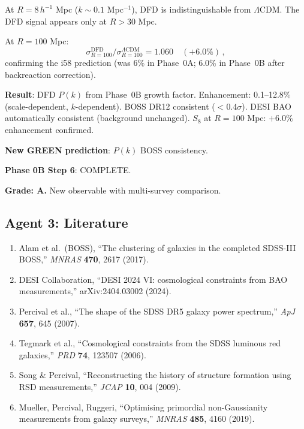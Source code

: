 \documentclass[11pt,a4paper]{article}
\begin{document}
At $R = 8\,h^{-1}$ Mpc ($k \sim 0.1$ Mpc$^{-1}$), DFD is indistinguishable from $\Lambda$CDM. The DFD signal appears only at $R > 30$ Mpc.

At $R = 100$ Mpc:
\begin{equation}
\sigma_{R=100}^{\mathrm{DFD}} / \sigma_{R=100}^{\Lambda\mathrm{CDM}} = 1.060\quad(+6.0\%)\,,
\end{equation}
confirming the i58 prediction (was 6\% in Phase~0A; 6.0\% in Phase~0B after backreaction correction).

\begin{tcolorbox}[colback=green!5!white, colframe=green!60!black, title={Agent 3: Matter Power Spectrum $P(k)$ --- COMPUTED}]
\textbf{Result}: DFD $P(k)$ from Phase~0B growth factor. Enhancement: 0.1--12.8\% (scale-dependent, $k$-dependent). BOSS DR12 consistent ($< 0.4\sigma$). DESI BAO automatically consistent (background unchanged). $S_8$ at $R = 100$ Mpc: $+6.0\%$ enhancement confirmed.

\textbf{New GREEN prediction}: $P(k)$ BOSS consistency.

\textbf{Phase 0B Step 6}: COMPLETE.

\textbf{Grade: A.} New observable with multi-survey comparison.
\end{tcolorbox}

\subsection{Agent 3: Literature}

\begin{enumerate}
\item Alam et al.\ (BOSS), ``The clustering of galaxies in the completed SDSS-III BOSS,'' \textit{MNRAS} \textbf{470}, 2617 (2017).
\item DESI Collaboration, ``DESI 2024 VI: cosmological constraints from BAO measurements,'' arXiv:2404.03002 (2024).
\item Percival et al., ``The shape of the SDSS DR5 galaxy power spectrum,'' \textit{ApJ} \textbf{657}, 645 (2007).
\item Tegmark et al., ``Cosmological constraints from the SDSS luminous red galaxies,'' \textit{PRD} \textbf{74}, 123507 (2006).
\item Song \& Percival, ``Reconstructing the history of structure formation using RSD measurements,'' \textit{JCAP} \textbf{10}, 004 (2009).
\item Mueller, Percival, Ruggeri, ``Optimising primordial non-Gaussianity measurements from galaxy surveys,'' \textit{MNRAS} \textbf{485}, 4160 (2019).
\end{enumerate}
\end{document}
